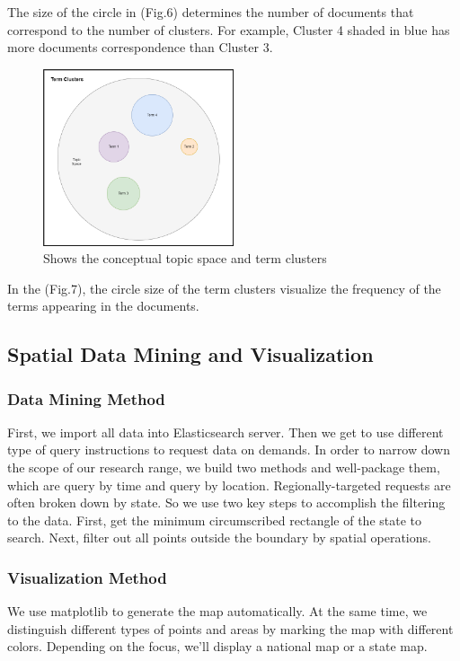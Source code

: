 The size of the circle in (Fig.6) determines the number of documents that
correspond to the number of clusters. For example, Cluster 4 shaded in blue
has more documents correspondence than Cluster 3.
\begin{figure}[H]
\centering
\includegraphics[width=0.5\textwidth]{imgs/term_clusters.png}
\caption{\label{fig:Research process} Shows the conceptual topic space and term clusters}
\end{figure}
In the (Fig.7), the circle size of the term clusters visualize the frequency
of the terms appearing in the documents.

\subsection{Spatial Data Mining and Visualization}
\subsubsection{Data Mining Method}
First, we import all data into Elasticsearch server. Then we get to use
different type of query instructions to request data on demands. In order to
narrow down the scope of our research range, we build two methods and
well-package them, which are query by time and query by location.
Regionally-targeted requests are often broken down by state. So we use two
key steps to accomplish the filtering to the data. First, get the minimum
circumscribed rectangle of the state to search. Next, filter out all points
outside  the boundary by spatial operations. 

\subsubsection{Visualization Method}
We use matplotlib to generate the map automatically. At the same time, we
distinguish different types of points and areas by marking the map with
different colors. Depending on the focus, we'll display a national map or a
state map.